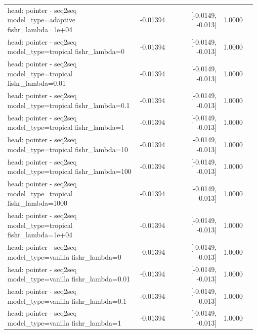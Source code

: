 \documentclass[10pt]{article}
\makeatletter
\newcommand{\stackcell}[1]{\begin{tabular}[t]{@{}l@{}}#1\end{tabular}}
\makeatother
\begin{document}
{\begin{longtable}{lrrrl}
\stackcell{head: pointer - seq2seq\\\footnotesize model\_type=adaptive fishr\_lambda=1e+04 } & -0.01394 & [-0.0149, -0.013] & 1.0000 & \\
\stackcell{head: pointer - seq2seq\\\footnotesize model\_type=tropical fishr\_lambda=0 } & -0.01394 & [-0.0149, -0.013] & 1.0000 & \\
\stackcell{head: pointer - seq2seq\\\footnotesize model\_type=tropical fishr\_lambda=0.01 } & -0.01394 & [-0.0149, -0.013] & 1.0000 & \\
\stackcell{head: pointer - seq2seq\\\footnotesize model\_type=tropical fishr\_lambda=0.1 } & -0.01394 & [-0.0149, -0.013] & 1.0000 & \\
\stackcell{head: pointer - seq2seq\\\footnotesize model\_type=tropical fishr\_lambda=1 } & -0.01394 & [-0.0149, -0.013] & 1.0000 & \\
\stackcell{head: pointer - seq2seq\\\footnotesize model\_type=tropical fishr\_lambda=10 } & -0.01394 & [-0.0149, -0.013] & 1.0000 & \\
\stackcell{head: pointer - seq2seq\\\footnotesize model\_type=tropical fishr\_lambda=100 } & -0.01394 & [-0.0149, -0.013] & 1.0000 & \\
\stackcell{head: pointer - seq2seq\\\footnotesize model\_type=tropical fishr\_lambda=1000 } & -0.01394 & [-0.0149, -0.013] & 1.0000 & \\
\stackcell{head: pointer - seq2seq\\\footnotesize model\_type=tropical fishr\_lambda=1e+04 } & -0.01394 & [-0.0149, -0.013] & 1.0000 & \\
\stackcell{head: pointer - seq2seq\\\footnotesize model\_type=vanilla fishr\_lambda=0 } & -0.01394 & [-0.0149, -0.013] & 1.0000 & \\
\stackcell{head: pointer - seq2seq\\\footnotesize model\_type=vanilla fishr\_lambda=0.01 } & -0.01394 & [-0.0149, -0.013] & 1.0000 & \\
\stackcell{head: pointer - seq2seq\\\footnotesize model\_type=vanilla fishr\_lambda=0.1 } & -0.01394 & [-0.0149, -0.013] & 1.0000 & \\
\stackcell{head: pointer - seq2seq\\\footnotesize model\_type=vanilla fishr\_lambda=1 } & -0.01394 & [-0.0149, -0.013] & 1.0000 & \\

\end{longtable}}
\end{document}
